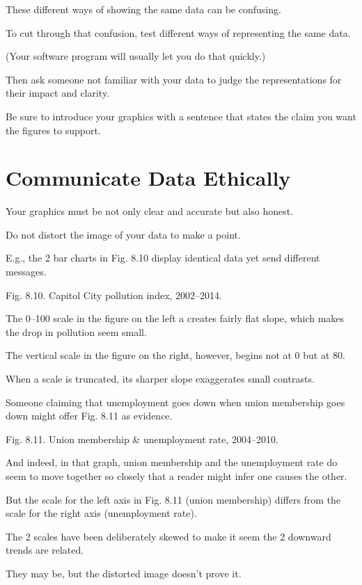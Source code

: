 \documentclass[oneside]{book}
\numberwithin{equation}{section}
\begin{document}
%
These different ways of showing the same data can be confusing.

To cut through that confusion, test different ways of representing the same data.

(Your software program will usually let you do that quickly.)

Then ask someone not familiar with your data to judge the representations for their impact and clarity.

Be sure to introduce your graphics with a sentence that states the claim you want the figures to support.

\section{Communicate Data Ethically}
Your graphics must be not only clear and accurate but also honest.

Do not distort the image of your data to make a point.

E.g., the 2 bar charts in Fig. 8.10 display identical data yet send different messages.

\textsf{Fig. 8.10. Capitol City pollution index, 2002--2014.}

The 0--100 scale in the figure on the left a creates fairly flat slope, which makes the drop in pollution seem small.

The vertical scale in the figure on the right, however, begins not at 0 but at 80.

When a scale is truncated, its sharper slope exaggerates small contrasts.

%

Someone claiming that unemployment goes down when union membership goes down might offer Fig. 8.11 as evidence.

\textsf{Fig. 8.11. Union membership \& unemployment rate, 2004--2010.}

And indeed, in that graph, union membership and the unemployment rate do seem to move together so closely that a reader might infer one causes the other.

But the scale for the left axis in Fig. 8.11 (union membership) differs from the scale for the right axis (unemployment rate).

The 2 scales have been deliberately skewed to make it seem the 2 downward trends are related.

They may be, but the distorted image doesn't prove it.
\end{document}
